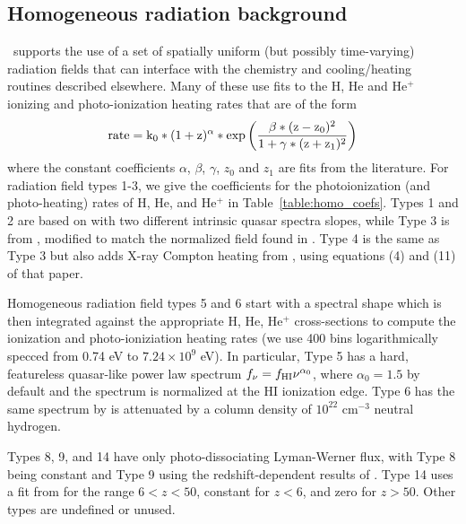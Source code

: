 \subsection{Homogeneous radiation background}
\label{sec.num.rad-homogeneous}

\enzo\ supports the use of a set of spatially uniform (but possibly time-varying) radiation fields that can interface with the chemistry and cooling/heating routines described elsewhere.  Many of these use fits to the H, He and He$^+$ ionizing and photo-ionization heating rates that are of the form
\begin{equation}
\rm{rate} = k_0 * (1+z)^{\alpha} * \exp{\left( \frac{\beta *(z-z_0)^2 }{1 + \gamma * (z+z_1)^2} \right)}
\label{eq:homo_rad_template}
\end{equation}
where the constant coefficients $\alpha$, $\beta$, $\gamma$, $z_0$ and $z_1$ are fits from the literature.  For radiation field types 1-3, we give the coefficients for the photoionization (and photo-heating) rates of H, He, and He$^+$ in Table~\ref{table:homo_coefs}.  Types 1 and 2 are based on \citet{1996ApJ...461...20H} with two different intrinsic quasar spectra slopes, while Type 3 is from \citet{2012ApJ...746..125H}, modified to match the normalized field found in \citet{Kirkman05}.  Type 4 is the same as Type 3 but also adds X-ray Compton heating from \citet{MadauEfstathiou99}, using equations (4) and (11) of that paper.

Homogeneous radiation field types 5 and 6 start with a spectral shape which is then integrated against the appropriate H, He, He$^+$ cross-sections to compute the ionization and photo-ioniziation heating rates (we use 400 bins logarithmically specced from 0.74 eV to $7.24 \times 10^9$ eV).  In particular, Type 5 has a hard, featureless quasar-like power law spectrum $f_{\nu} = f_{\rm HI} \nu^{\alpha_0}$, where $\alpha_0 = 1.5$ by default and the spectrum is normalized at the HI ionization edge.  Type 6 has the same spectrum by is attenuated by a column density of $10^{22}$ cm$^{-3}$ neutral hydrogen.  

Types 8, 9, and 14 have only photo-dissociating Lyman-Werner flux, with Type 8 being constant and Type 9 using the redshift-dependent results of \citet{TrentiStiavelli09}.  Type 14 uses a fit from \citet{WiseAbel05} for the range $6 < z < 50$, constant for $z<6$, and zero for $z > 50$.  Other types are undefined or unused.

